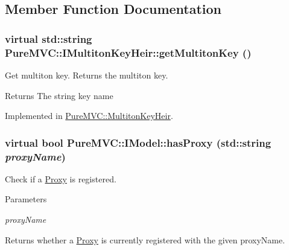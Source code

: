 \subsection{Member Function Documentation}
\hypertarget{class_pure_m_v_c_1_1_i_multiton_key_heir_aecccfb9898368c6377550ceae5730934}{
\subsubsection[{getMultitonKey}]{\setlength{\rightskip}{0pt plus 5cm}virtual std::string PureMVC::IMultitonKeyHeir::getMultitonKey ()}}
\label{class_pure_m_v_c_1_1_i_multiton_key_heir_aecccfb9898368c6377550ceae5730934}


Get multiton key. Returns the multiton key. \begin{DoxyReturn}{Returns}
The string key name 
\end{DoxyReturn}


Implemented in \hyperlink{class_pure_m_v_c_1_1_multiton_key_heir_aa5622459d33380deb08dc3cab8b991c7}{PureMVC::MultitonKeyHeir}.\hypertarget{class_pure_m_v_c_1_1_i_model_acb4d2a8493d547e597a3a3cfbbb7903b}{
\subsubsection[{hasProxy}]{\setlength{\rightskip}{0pt plus 5cm}virtual bool PureMVC::IModel::hasProxy (std::string {\em proxyName})}}
\label{class_pure_m_v_c_1_1_i_model_acb4d2a8493d547e597a3a3cfbbb7903b}


Check if a \hyperlink{class_pure_m_v_c_1_1_proxy}{Proxy} is registered. 
\begin{DoxyParams}{Parameters}
\item[{\em proxyName}]\end{DoxyParams}
\begin{DoxyReturn}{Returns}
whether a \hyperlink{class_pure_m_v_c_1_1_proxy}{Proxy} is currently registered with the given {\ttfamily proxyName}. 
\end{DoxyReturn}


